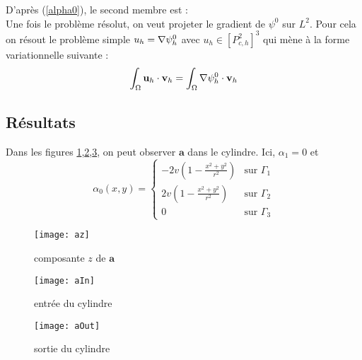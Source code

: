 D'après (\ref{alpha0}), le second membre est :\\


Une fois le problème résolut, on veut projeter le gradient de $\psi^0$ sur $L^2$. Pour cela on résout le problème simple $u_h={\nabla}\psi_h^0$ avec $u_h\in [P^2_{c,h}]^3$ qui mène à la forme variationnelle suivante :
\[ \int_\Omega \mathbf{u}_h\cdot\mathbf{v}_h = \int_\Omega {\nabla}\psi_h^0\cdot\mathbf{v}_h \]



\subsection{Résultats}
Dans les figures \ref{az},\ref{aIn},\ref{aOut}, on peut observer $\mathbf{a}$ dans le cylindre. Ici, $\alpha_1=0$ et 
\[ \alpha_0(x,y)= \begin{cases} -2v\left(1-\frac{x^2+y^2}{r^2}\right) &\mbox{sur } \Gamma_1\\
2v\left(1-\frac{x^2+y^2}{r^2}\right)&\mbox{sur } \Gamma_2\\
0 &\mbox{sur } \Gamma_3 \end{cases} \]

\begin{figure}[H]
\centering
\texttt{[image: az]}
\caption{composante $z$ de $\mathbf{a}$}
\label{az}
\end{figure}
\begin{figure}[H]
\centering
\texttt{[image: aIn]}
\caption{entrée du cylindre}
\label{aIn}
\end{figure}
\begin{figure}[H]
\centering
\texttt{[image: aOut]}
\caption{sortie du cylindre}
\label{aOut}
\end{figure}


